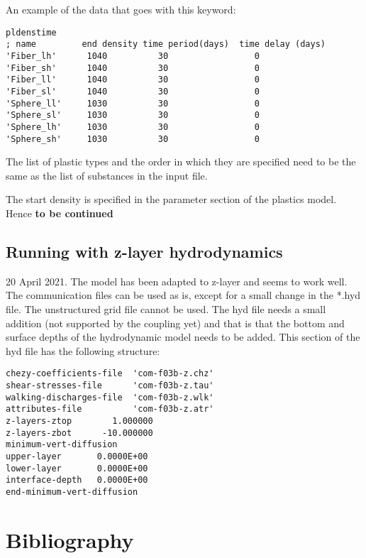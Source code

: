 \documentclass[english]{deltares_manual}
\begin{document}
An example of the data that goes with this keyword:
\begin{tcolorbox}
\begin{Verbatim}
pldenstime
; name         end density time period(days)  time delay (days)
'Fiber_lh'      1040          30                 0
'Fiber_sh'      1040          30                 0
'Fiber_ll'      1040          30                 0
'Fiber_sl'      1040          30                 0
'Sphere_ll'     1030          30                 0
'Sphere_sl'     1030          30                 0
'Sphere_lh'     1030          30                 0
'Sphere_sh'     1030          30                 0
\end{Verbatim}
\end{tcolorbox}
The list of plastic types and the order in which they are specified need to be the same as the list of substances in the input file.

The start density is specified in the parameter section of the plastics model. 
Hence
\textbf{to be continued}

\section{Running with z-layer hydrodynamics}
20 April 2021.
The model has been adapted to z-layer and seems to work well. The communication files can be used as is, except for a small change in the *.hyd file. The unstructured grid file cannot be used. 
The hyd file needs a small addition (not supported by the coupling yet) and that is that the bottom and surface depths of the hydrodynamic model needs to be added. 
This section of the hyd file has the following structure:
\begin{tcolorbox}
\begin{Verbatim}
chezy-coefficients-file  'com-f03b-z.chz'
shear-stresses-file      'com-f03b-z.tau'
walking-discharges-file  'com-f03b-z.wlk'
attributes-file          'com-f03b-z.atr'
z-layers-ztop        1.000000
z-layers-zbot      -10.000000
minimum-vert-diffusion   
upper-layer       0.0000E+00
lower-layer       0.0000E+00
interface-depth   0.0000E+00
end-minimum-vert-diffusion
\end{Verbatim}
\end{tcolorbox}


\chapter*{Bibliography}


\end{document}
